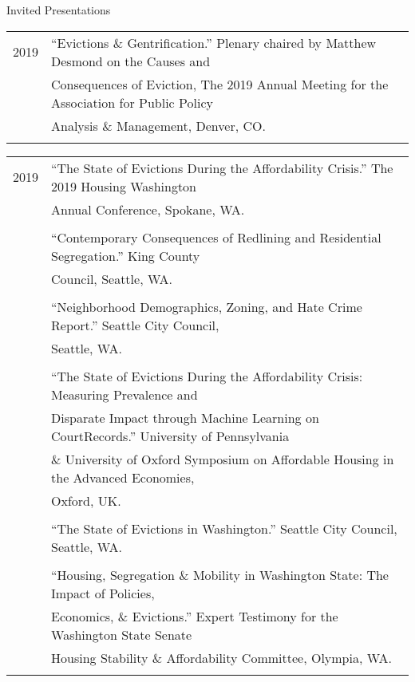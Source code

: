 \documentclass{resume} %
\begin{document}
%
%

\begin{rSection}{Invited Presentations}
\vspace{5mm}
\begin{tabular}{ @{} >{}l @{\hspace{6ex}} l }

2019	&``Evictions \& Gentrification.'' Plenary chaired by Matthew Desmond on the Causes and\\
		& Consequences of Eviction, The 2019 Annual Meeting for the Association for Public Policy\\
		& Analysis \& Management, Denver, CO.\\\\
\end{tabular}

\begin{tabular}{ @{} >{}l @{\hspace{6ex}} l }
2019	&``The State of Evictions During the Affordability Crisis.'' The 2019 Housing Washington\\ 
		&Annual Conference, Spokane, WA.\\\\

		&``Contemporary Consequences of Redlining and Residential Segregation.'' King County\\
		& Council, Seattle, WA.\\\\

		&``Neighborhood Demographics, Zoning, and Hate Crime Report.'' Seattle City Council,\\
		&Seattle, WA.\\\\

		&``The State of Evictions During the Affordability Crisis: Measuring Prevalence and\\
		&Disparate Impact through Machine Learning on CourtRecords.'' University of Pennsylvania\\
		&\& University of Oxford Symposium on Affordable Housing in the Advanced Economies,\\
		&Oxford, UK.\\\\

		&``The State of Evictions in Washington.'' Seattle City Council, Seattle, WA.\\\\

	 	&``Housing, Segregation \& Mobility in Washington State: The Impact of Policies,\\
		& Economics, \& Evictions.'' Expert Testimony for the Washington State Senate\\
		& Housing Stability \& Affordability Committee, Olympia, WA.\\\\


\end{tabular}
\end{rSection}
\end{document}
